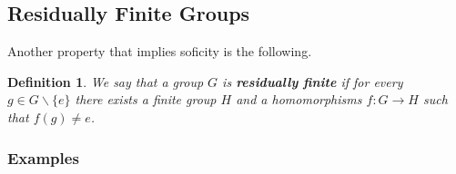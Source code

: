 \documentclass[titlepage, a4paper]{article}
\newtheorem{definition}[theorem]{Definition}
\theoremstyle{remark}
\begin{document}
\subsection{Residually Finite Groups}

Another property that implies soficity is the following.

\begin{definition}\cite{noauthor_residually_2018} \label{def:res_fin}
	We say that a group $G$ is \textbf{residually finite} if for every $g \in G\backslash\{e\}$ there exists a finite group $H$ and a homomorphisms $f:G \to H$ such that $f(g) \ne e$.
\end{definition}


\subsubsection{Examples}
\end{document}

